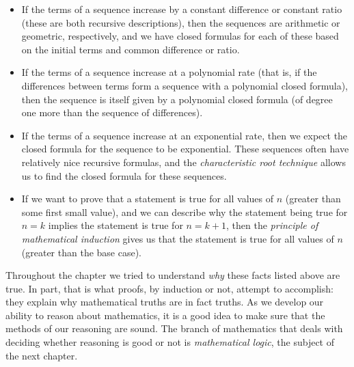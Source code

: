 \documentclass[12pt]{article}
\begin{document}
\begin{itemize}
\item If the terms of a sequence increase by a constant difference or constant ratio (these are both recursive descriptions), then the sequences are arithmetic or geometric, respectively, and we have closed formulas for each of these based on the initial terms and common difference or ratio.
\item If the terms of a sequence increase at a polynomial rate (that is, if the differences between terms form a sequence with a polynomial closed formula), then the sequence is itself given by a polynomial closed formula (of degree one more than the sequence of differences).  
\item If the terms of a sequence increase at an exponential rate, then we expect the closed formula for the sequence to be exponential.  These sequences often have relatively nice recursive formulas, and the \emph{characteristic root technique} allows us to find the closed formula for these sequences.
\item If we want to prove that a statement is true for all values of $n$ (greater than some first small value), and we can describe why the statement being true for $n = k$ implies the statement is true for $n = k+1$, then the \emph{principle of mathematical induction} gives us that the statement is true for all values of $n$ (greater than the base case).  
\end{itemize}

Throughout the chapter we tried to understand \emph{why} these facts listed above are true.  In part, that is what proofs, by induction or not, attempt to accomplish: they explain why mathematical truths are in fact truths.  As we develop our ability to reason about mathematics, it is a good idea to make sure that the methods of our reasoning are sound.  The branch of mathematics that deals with deciding whether reasoning is good or not is \emph{mathematical logic}, the subject of the next chapter.  
\end{document}
